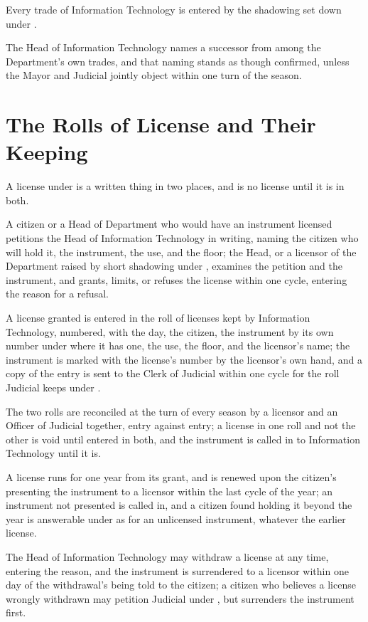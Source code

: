 Every trade of Information Technology is entered by the shadowing set down under .

\begin{clauses}
\item The Head of Information Technology names a successor from among the Department's own trades, and that naming stands as though confirmed, unless the Mayor and Judicial jointly object within one turn of the season.
\end{clauses}

\section{The Rolls of License and Their Keeping}
\label{sec:it:rolls-of-license-and-their-keeping}

A license under  is a written thing in two places, and is no license until it is in both.

\begin{clauses}
\item A citizen or a Head of Department who would have an instrument licensed petitions the Head of Information Technology in writing, naming the citizen who will hold it, the instrument, the use, and the floor; the Head, or a licensor of the Department raised by short shadowing under , examines the petition and the instrument, and grants, limits, or refuses the license within one cycle, entering the reason for a refusal.
\item A license granted is entered in the roll of licenses kept by Information Technology, numbered, with the day, the citizen, the instrument by its own number under  where it has one, the use, the floor, and the licensor's name; the instrument is marked with the license's number by the licensor's own hand, and a copy of the entry is sent to the Clerk of Judicial within one cycle for the roll Judicial keeps under .
\item The two rolls are reconciled at the turn of every season by a licensor and an Officer of Judicial together, entry against entry; a license in one roll and not the other is void until entered in both, and the instrument is called in to Information Technology until it is.
\item A license runs for one year from its grant, and is renewed upon the citizen's presenting the instrument to a licensor within the last cycle of the year; an instrument not presented is called in, and a citizen found holding it beyond the year is answerable under  as for an unlicensed instrument, whatever the earlier license.
\item The Head of Information Technology may withdraw a license at any time, entering the reason, and the instrument is surrendered to a licensor within one day of the withdrawal's being told to the citizen; a citizen who believes a license wrongly withdrawn may petition Judicial under , but surrenders the instrument first.
\end{clauses}

